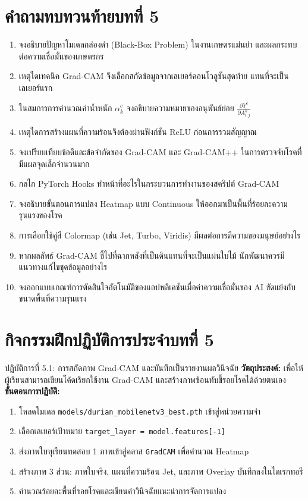 \section*{คำถามทบทวนท้ายบทที่ 5}
\begin{enumerate}[leftmargin=1.8em, itemsep=4pt]
    \item จงอธิบายปัญหาโมเดลกล่องดำ (Black-Box Problem) ในงานเกษตรแม่นยำ และผลกระทบต่อความเชื่อมั่นของเกษตรกร
    \item เหตุใดเทคนิค Grad-CAM จึงเลือกสกัดข้อมูลจากเลเยอร์คอนโวลูชันสุดท้าย แทนที่จะเป็นเลเยอร์แรก
    \item ในสมการการคำนวณค่าน้ำหนัก $\alpha_k^c$ จงอธิบายความหมายของอนุพันธ์ย่อย $\frac{\partial Y^c}{\partial A_{i,j}^k}$
    \item เหตุใดการสร้างแผนที่ความร้อนจึงต้องผ่านฟังก์ชัน $\text{ReLU}$ ก่อนการรวมสัญญาณ
    \item จงเปรียบเทียบข้อดีและข้อจำกัดของ Grad-CAM และ Grad-CAM++ ในการตรวจจับโรคที่มีแผลจุดเล็กจำนวนมาก
    \item กลไก PyTorch Hooks ทำหน้าที่อะไรในกระบวนการทำงานของสคริปต์ Grad-CAM
    \item จงอธิบายขั้นตอนการแปลง Heatmap แบบ Continuous ให้ออกมาเป็นพื้นที่ร้อยละความรุนแรงของโรค
    \item การเลือกใช้คู่สี Colormap (เช่น Jet, Turbo, Viridis) มีผลต่อการตีความของมนุษย์อย่างไร
    \item หากผลลัพธ์ Grad-CAM ชี้ไปที่ฉากหลังที่เป็นดินแทนที่จะเป็นแผ่นใบไม้ นักพัฒนาควรมีแนวทางแก้ไขชุดข้อมูลอย่างไร
    \item จงออกแบบเกณฑ์การตัดสินใจอัตโนมัติของแอปพลิเคชันเมื่อค่าความเชื่อมั่นของ AI ขัดแย้งกับขนาดพื้นที่ความรุนแรง
\end{enumerate}

\section*{กิจกรรมฝึกปฏิบัติการประจำบทที่ 5}
\begin{nocodebox}{ปฏิบัติการที่ 5.1: การสกัดภาพ Grad-CAM และบันทึกเป็นรายงานผลวินิจฉัย}
\textbf{วัตถุประสงค์:} เพื่อให้ผู้เรียนสามารถเขียนโค้ดเรียกใช้งาน Grad-CAM และสร้างภาพซ้อนทับชี้รอยโรคได้ด้วยตนเอง\\
\textbf{ขั้นตอนการปฏิบัติ:}
\begin{enumerate}[leftmargin=1.4em, itemsep=2pt]
    \item โหลดโมเดล \texttt{models/durian\_mobilenetv3\_best.pth} เข้าสู่หน่วยความจำ
    \item เลือกเลเยอร์เป้าหมาย \texttt{target\_layer = model.features[-1]}
    \item ส่งภาพใบทุเรียนทดสอบ 1 ภาพเข้าสู่คลาส \texttt{GradCAM} เพื่อคำนวณ Heatmap
    \item สร้างภาพ 3 ส่วน: ภาพใบจริง, แผนที่ความร้อน Jet, และภาพ Overlay บันทึกลงในไดเรกทอรี
    \item คำนวณร้อยละพื้นที่รอยโรคและเขียนคำวินิจฉัยแนะนำการจัดการแปลง
\end{enumerate}
\end{nocodebox}
